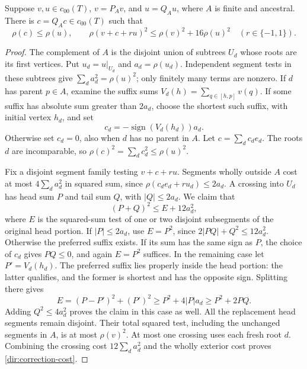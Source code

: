 \begin{lemma}\label{dir:root-correction}
Suppose $v,u\in c_{00}(T)$, $v=P_Av$, and $u=Q_Au$, where $A$ is finite
and ancestral.  There is $c=Q_Ac\in c_{00}(T)$ such that
\begin{equation}\label{dir:correction-cost}
 \rho(c)\le\rho(u),\qquad
 \rho(v+c+r u)^2\le\rho(v)^2+16\rho(u)^2
 \quad(r\in\{-1,1\}).
\end{equation}
\end{lemma}
\begin{proof}
The complement of $A$ is the disjoint union of subtrees $U_d$ whose
roots are its first vertices.  Put $u_d=u|_{U_d}$ and $a_d=\rho(u_d)$.
Independent segment tests in these subtrees give
$\sum_d a_d^2=\rho(u)^2$; only finitely many terms are nonzero.
If $d$ has parent $p\in A$, examine the suffix sums
$V_d(h)=\sum_{q\in[h,p]}v(q)$.  If some suffix has absolute sum greater
than $2a_d$, choose the shortest such suffix, with initial vertex $h_d$, and set
\[
 c_d=-\operatorname{sign}(V_d(h_d))a_d.
\]
Otherwise set $c_d=0$, also when $d$ has no parent in $A$.  Let
$c=\sum_dc_de_d$.  The roots $d$ are incomparable, so
$\rho(c)^2=\sum_dc_d^2\le\rho(u)^2$.

Fix a disjoint segment family testing $v+c+ru$.  Segments wholly outside
$A$ cost at most $4\sum_da_d^2$ in squared sum, since
$\rho(c_de_d+ru_d)\le2a_d$.  A crossing into $U_d$ has head sum $P$ and
tail sum $Q$, with $|Q|\le2a_d$.  We claim that
\[
 (P+Q)^2\le E+12a_d^2,
\]
where $E$ is the squared-sum test of one or two disjoint subsegments of
the original head portion.  If $|P|\le2a_d$, use $E=P^2$, since
$2|PQ|+Q^2\le12a_d^2$.  Otherwise the preferred suffix exists.  If its
sum has the same sign as $P$, the choice of $c_d$ gives $PQ\le0$, and
again $E=P^2$ suffices.  In the remaining case let $P'=V_d(h_d)$.
The preferred suffix lies properly inside the head portion: the latter
qualifies, and the former is shortest and has the opposite sign.
Splitting there gives
\[
 E=(P-P')^2+(P')^2\ge P^2+4|P|a_d\ge P^2+2PQ.
\]
Adding $Q^2\le4a_d^2$ proves the claim in this case as well.
All the replacement head segments remain disjoint.  Their total squared
test, including the unchanged segments in $A$, is at most $\rho(v)^2$.
At most one crossing uses each fresh root $d$.  Combining the crossing
cost $12\sum_da_d^2$ and the wholly exterior cost proves
\eqref{dir:correction-cost}.
\end{proof}

